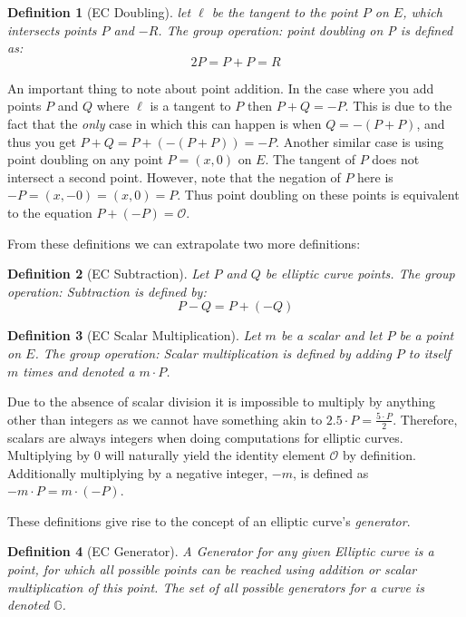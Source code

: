 \documentclass{article}
\newtheorem{definition}{Definition}[section]
\renewcommand{\O}{\mathcal{O}}
\newcommand{\G}{\mathbb{G}}
\begin{document}
\begin{definition}[EC Doubling]
	let $\ell$ be the tangent to the point $P$ on $E$, which intersects
	points $P$ and $-R$. The group operation: point doubling on P is
	defined as:
	$$2P = P + P = R$$
\end{definition}

An important thing to note about point addition. In the case where
you add points $P$ and $Q$ where $\ell$ is a tangent to $P$ then $P +
Q = -P$. This is due to the fact that the \textit{only} case in which
this can happen is when $Q = -(P + P)$, and thus you get $P + Q = P +
(-(P + P)) = -P$. Another similar case is using point doubling on any
point $P = (x,0)$ on $E$. The tangent of $P$ does not intersect
a second point. However, note that the negation of $P$ here is $-P =
(x,-0) = (x,0) = P$. Thus point doubling on these points is equivalent
to the equation $P + (-P) = \O$.

From these definitions we can extrapolate two more definitions:

\begin{definition}[EC Subtraction]
	Let $P$ and $Q$ be elliptic curve points. The group operation:
	Subtraction is defined by:
	$$P-Q = P + (-Q)$$
\end{definition}

\begin{definition}[EC Scalar Multiplication]
	Let $m$ be a scalar and let $P$ be a point on $E$. The group
	operation: Scalar multiplication is defined by adding $P$
	to itself $m$ times and denoted a $m\cdot P$.
\end{definition}

Due to the absence of scalar division it is impossible to multiply by
anything other than integers as we cannot have something akin to $2.5
\cdot P = \frac{5\cdot P}{2}$. Therefore, scalars are always integers
when doing computations for elliptic curves. Multiplying by $0$ will
naturally yield the identity element $\mathcal{O}$ by definition.
Additionally multiplying by a negative integer, ${-m}$, is defined as
$-m\cdot P = m\cdot ({-P})$.

These definitions give rise to the concept of an elliptic
curve's \textit{generator}.

\begin{definition}[EC Generator]
	A Generator for any given Elliptic curve is a point, for
	which all possible points can be reached using addition or
	scalar multiplication of this point. The set of all possible
	generators for a curve is denoted $\G$.
\end{definition}
\end{document}
